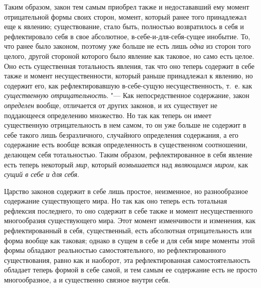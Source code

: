 Таким образом, закон тем самым приобрел также и недостававший ему момент
отрицательной формы своих сторон, момент, который ранее того принадлежал
еще к явлению; существование, стало быть, полностью возвратилось в себя и
рефлектировало себя в свое абсолютное, в-себе-и-для-себя-сущее инобытие.
То, что ранее было законом, поэтому уже больше не есть лишь
{\em одна} из сторон того целого, другой стороной
которого было явление как таковое, но само есть целое. Оно есть
существенная тотальность явления, так что оно теперь содержит в себе также
и момент несущественности, который раньше принадлежал к явлению, но
содержит его, как рефлектировавшую в-себе-сущую несущественность, т.~е. как
{\em существенную отрицательность}. "--- Как
непосредственное содержание, закон {\em определен}
вообще, отличается от других законов, и их существует не поддающееся
определению множество. Но так как теперь он имеет существенную
отрицательность в нем самом, то он уже больше не содержит в себе такого
лишь безразличного, случайного определения содержания, а его содержание
есть вообще всякая определенность в существенном соотношении, делающем себя
тотальностью. Таким образом, рефлектированное в себя явление есть теперь
некоторый {\em мир}, который
{\em возвышается} над
{\em являющимся миром}, как
{\em сущий в себе и для себя}.

Царство законов содержит в себе лишь простое, неизменное, но разнообразное
содержание существующего мира. Но так как оно теперь есть тотальная
рефлексия последнего, то оно содержит в себе также и момент несущественного
многообразия существующего мира. Этот момент изменчивости и изменения, как
рефлектированный в себя, существенный, есть абсолютная отрицательность или
форма вообще как таковая; однако в сущем в себе и для себя мире моменты
этой формы обладают реальностью самостоятельного, но рефлектированного
существования, равно как и наоборот, эта рефлектированная самостоятельность
обладает теперь формой в себе самой, и тем самым ее содержание есть не
просто многообразное, а и существенно связное внутри себя.

